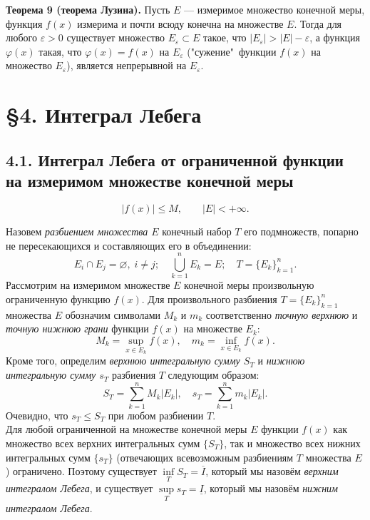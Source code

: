 \documentclass[12pt,a4paper, titlepage]{article}
\begin{document}
\textbf{Теорема 9 (теорема Лузина).} Пусть $E$ --- измеримое множество конечной меры, функция $f(x)$ измерима и почти всюду конечна на множестве $E$. Тогда для любого $\varepsilon > 0$ существует множество $E_\varepsilon \subset E$ такое, что $|E_\varepsilon| > |E| - \varepsilon$, а функция $\varphi(x)$ такая, что $\varphi(x) = f(x)$ на $E_\varepsilon$ ("сужение"\ функции $f(x)$ на множество $E_\varepsilon$), является непрерывной на $E_\varepsilon$.\\










\section*{\S 4. Интеграл Лебега}

\subsection*{4.1. Интеграл Лебега от ограниченной функции на измеримом множестве конечной меры}

$$
|f(x)| \leqslant M, \qquad |E| < + \infty.
$$

Назовем \textit{разбиением множества $E$} конечный набор $T$ его подмножеств, попарно не пересекающихся и составляющих его в объединении:
$$
E_i \cap E_j = \varnothing, \; i \neq j; \quad \bigcup_{k=1}^n E_k = E; \quad T = \lbrace E_k \rbrace_{k=1}^n.
$$
Рассмотрим на измеримом множестве $E$ конечной меры произвольную ограниченную функцию $f(x)$. Для произвольного разбиения $T = \lbrace E_k \rbrace_{k=1}^n$ множества $E$ обозначим символами $M_k$ и $m_k$ соответственно \textit{точную верхнюю} и \textit{точную нижнюю грани} функции $f(x)$ на множестве $E_k$:
$$
M_k = \sup_{x\in E_k} f(x), \quad m_k = \inf_{x\in E_k} f(x).
$$
Кроме того, определим \textit{верхнюю интегральную сумму $S_T$} и \textit{нижнюю интегральную сумму $s_T$} разбиения $T$ следующим образом:
$$
S_T = \sum_{k=1}^n M_k |E_k|, \quad s_T = \sum_{k=1}^n m_k |E_k|.
$$
Очевидно, что $s_T \leqslant S_T$ при любом разбиении $T$.\\

Для любой ограниченной на множестве конечной меры $E$ функции $f(x)$ как множество всех верхних интегральных сумм $\lbrace S_T \rbrace$, так и множество всех нижних интегральных сумм $\lbrace s_T \rbrace$ (отвечающих всевозможным разбиениям $T$ множества $E$) ограничено. Поэтому существует $\inf\limits_T S_T = \overline{I}$, который мы назовём \textit{верхним интегралом Лебега}, и существует $\sup\limits_T s_T = \underline{I}$, который мы назовём \textit{нижним интегралом Лебега}.\\
\end{document}
